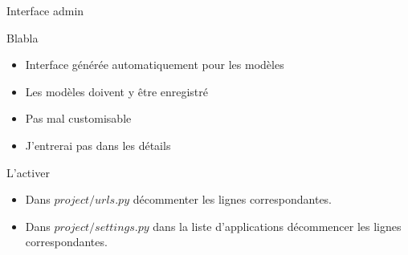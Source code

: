 \documentclass{beamer}
\begin{document}
\begin{frame}[fragile]{}
\begin{LARGE}
\begin{center}
Interface admin
\end{center}
\end{LARGE}
\end{frame}

\begin{frame}[fragile]{Blabla}
    \begin{itemize}
        \item Interface générée automatiquement pour les modèles
        \item Les modèles doivent y être enregistré
        \item Pas mal customisable
        \item J'entrerai pas dans les détails
    \end{itemize}
\end{frame}

\begin{frame}[fragile]{L'activer}
    \begin{itemize}
        \item Dans $project/urls.py$ décommenter les lignes correspondantes.
        \item Dans $project/settings.py$ dans la liste d'applications décommencer les lignes correspondantes.
    \end{itemize}
\end{frame}
\end{document}

